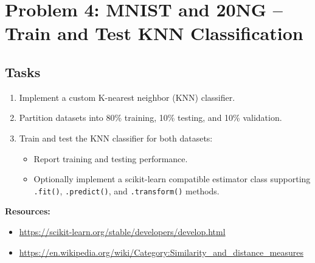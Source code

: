 \documentclass{article}
\begin{document}
\section*{Problem 4: MNIST and 20NG -- Train and Test KNN Classification}
\subsection*{Tasks}
\begin{enumerate}
    \item Implement a custom K-nearest neighbor (KNN) classifier.
    \item Partition datasets into 80\% training, 10\% testing, and 10\% validation.
    \item Train and test the KNN classifier for both datasets:
    \begin{itemize}
        \item Report training and testing performance.
        \item Optionally implement a scikit-learn compatible estimator class supporting \texttt{.fit()}, \texttt{.predict()}, and \texttt{.transform()} methods.
    \end{itemize}
\end{enumerate}

\textbf{Resources:}
\begin{itemize}
    \item \url{https://scikit-learn.org/stable/developers/develop.html}
    \item \url{https://en.wikipedia.org/wiki/Category:Similarity_and_distance_measures}
\end{itemize}
\end{document}
